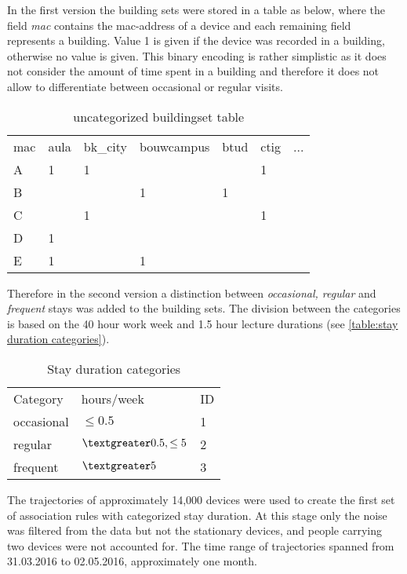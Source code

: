 In the first version the building sets were stored in a table as below, where the
field \textit{mac} contains the mac-address of a device and each remaining field
represents a building. Value 1 is given if the device was recorded in a
building, otherwise no value is given. This binary encoding is rather simplistic
as it does not consider the amount of time spent in a building and therefore it
does not allow to differentiate between occasional or regular visits.

\begin{table}[H]
\centering
\captionsetup{justification=centering}
\caption{uncategorized buildingset table}
\label{uncategorized buildingset table}
\begin{tabular}{lllllll}
\cline{1-7}
mac & aula & bk\_city & bouwcampus & btud & ctig & ... \\ \cline{1-7}
A   & 1 & 1     &           &   & 1 &   \\
B   &   &       & 1         & 1 &   &   \\
C   &   & 1     &           &   & 1 &   \\
D   & 1 &       &           &   &   &   \\
E   & 1 &       & 1         &   &   &   \\ \cline{1-7}
\end{tabular}
\end{table}

Therefore in the second version a distinction between \textit{occasional,
regular} and \textit{frequent} stays was added to the building sets. The division
between the categories is based on the 40 hour work week and 1.5 hour lecture
durations (see \autoref{table:stay duration categories}). 

\begin{table}[H]
\centering
\captionsetup{justification=centering}
\caption{Stay duration categories}
\label{table:stay duration categories}
\begin{tabular}{lll}
\cline{1-3}
Category   & hours/week             & ID \\ \cline{1-3}
occasional & $\leq 0.5$                 & 1  \\
regular & $\textgreater 0.5, \leq 5$ & 2  \\
frequent   & $\textgreater 5$           & 3
\end{tabular}
\end{table}

The trajectories of approximately 14,000 devices were used to create the first
set of association rules with categorized stay duration. At this stage only the
noise was filtered from the data but not the stationary devices, and people
carrying two devices were not accounted for. The time range of trajectories
spanned from 31.03.2016 to 02.05.2016, approximately one month.

